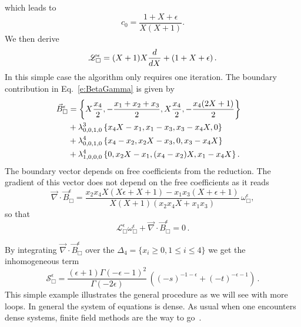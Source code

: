 \documentclass[a4paper,12pt]{article}
\numberwithin{equation}{section}
\numberwithin{figure}{section}
\begin{document}
which leads to 
%
\begin{equation}
	c_0= \frac{1+X+\epsilon }{X(X+1)}.
\end{equation}
We then derive
\begin{equation}\label{e:PFBox}
	\mathscr{L}_\Box^\epsilon= (X+1) X {d\over dX}+(1+X+\epsilon)  \,.
\end{equation}
In this simple case the algorithm only requires one iteration.
The boundary contribution in Eq.~\eqref{e:BetaGamma} is given by
\begin{align}
  \vec B_\Box^\epsilon&=\left\{X\frac{x_4}{2},-\frac{x_1+x_2+x_3}{2
                   },X\frac{x_4}{2},-\frac{x_4 (2 X+1)}{2
                   }\right\}\cr
                   &+\lambda_{0,0,1,0}^3 \left\{x_4
                     X-x_1,x_1-x_3,x_3-x_4 X,0\right\}\cr
                     &+\lambda_{0,0,1,0}^4 \left\{x_4-x_2,x_2 X-x_3,0,x_3-x_4 X\right\}\cr
                       &+\lambda_{1,0,0,0}^4 \left\{0,x_2 X-x_1,(x_4-x_2) X,x_1-x_4 X\right\}.
\end{align}
The boundary vector depends on free coefficients from the
reduction. 
The gradient of this vector does not depend on the free coefficients
as it reads
\begin{equation}
  \vec\nabla\cdot\vec B_\Box^\epsilon=\frac{x_2 x_4 X (X \epsilon +X+1)-x_1 x_3 (X+\epsilon +1)}{X (X+1) (x_2 x_4 X+x_1
   x_3)}\, \omega_\Box^\epsilon  ,
\end{equation}
so that 
\begin{equation}
  	\mathscr{L}_\Box^\epsilon    \omega_\Box^\epsilon+\vec\nabla\cdot\vec B_\Box^\epsilon=0\,.
\end{equation}

By integrating  $\vec\nabla\cdot\vec B_\Box^\epsilon$ over the
$\Delta_4=\{x_i\geq0,1\leq i\leq 4\}$ we get the
inhomogeneous term 
\begin{equation}\label{e:SourceBox}
	\mathscr{S}_\Box^\epsilon=\frac{(\epsilon +1)\Gamma (-\epsilon -1)^2 }{\Gamma
		(-2 \epsilon )}  \, \left( (-s)^{-1-\epsilon }+(-t)^{-\epsilon -1}\right) \, .
\end{equation}
This simple example illustrates the general procedure as we will see with more loops. In general the system of equations is dense. As usual when one encounters dense  systems, finite field methods are the way to go~\cite{Peraro:2019svx}.
\end{document}
